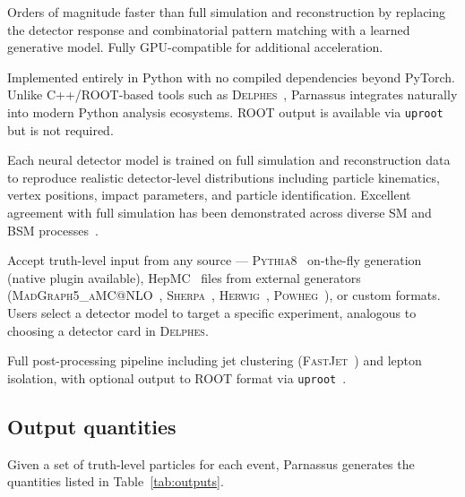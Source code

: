\documentclass[11pt,a4paper]{article}          %
\begin{document}
\begin{description}[style=nextline,leftmargin=2.5cm]
  \item[\textbf{Speed}] Orders of magnitude faster than full simulation and
    reconstruction by replacing the detector response and combinatorial pattern matching with a learned
    generative model. Fully GPU-compatible for additional acceleration.
  \item[\textbf{Pure Python}] Implemented entirely in Python with no compiled
    dependencies beyond PyTorch. Unlike C++/ROOT-based tools such as
    \textsc{Delphes}~\cite{delphes}, Parnassus integrates naturally into
    modern Python analysis ecosystems. ROOT output is available via
    \texttt{uproot} but is not required.
  \item[\textbf{Fidelity}] Each neural detector model is trained on full simulation and
    reconstruction data to reproduce realistic detector-level distributions
    including particle kinematics, vertex positions, impact parameters, and
    particle identification. Excellent agreement with full simulation has been
    demonstrated across diverse SM and BSM processes~\cite{parnassus_v1,parnassus_v2,parnassus_lep}.
  \item[\textbf{Flexibility}] Accept truth-level input from any source ---
    \textsc{Pythia8}~\cite{pythia8} on-the-fly generation (native plugin available), HepMC~\cite{hepmc3}
    files from external generators (\textsc{MadGraph5\_aMC@NLO}~\cite{madgraph},
    \textsc{Sherpa}~\cite{sherpa}, \textsc{Herwig}~\cite{herwig},
    \textsc{Powheg}~\cite{powheg}), or custom formats. Users select a detector
    model to target a specific experiment, analogous to choosing a detector card
    in \textsc{Delphes}.
  \item[\textbf{Completeness}] Full post-processing pipeline including jet
    clustering (\textsc{FastJet}~\cite{fastjet}) and lepton isolation, with
    optional output to ROOT format via \texttt{uproot}~\cite{uproot}.
\end{description}

\subsection{Output quantities}

Given a set of truth-level particles for each event, Parnassus generates the
quantities listed in Table~\ref{tab:outputs}.
\end{document}
